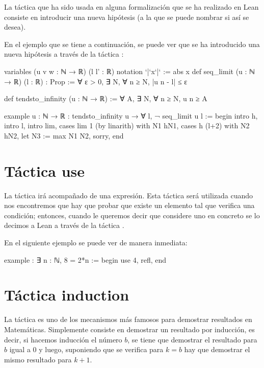 La táctica  que ha sido usada en alguna formalización que
se ha realizado en Lean consiste en introducir una nueva hipótesis (a la que
se puede nombrar si así se desea).

En el ejemplo que se tiene a continuación, se puede ver que se ha introducido
una nueva hipótesis a través de la táctica :

\begin{leancode}
variables (u v w : ℕ → ℝ) (l l' : ℝ)
notation `|`x`|` := abs x
def seq_limit (u : ℕ → ℝ) (l : ℝ) : Prop :=
∀ ε > 0, ∃ N, ∀ n ≥ N, |u n - l| ≤ ε

def tendsto_infinity (u : ℕ → ℝ) := ∀ A, ∃ N, ∀ n ≥ N, u n ≥ A

example {u : ℕ → ℝ} : tendsto_infinity u → ∀ l, ¬ seq_limit u l :=
begin
  intro h,
  intro l,
  intro lim,
  cases lim 1 (by linarith) with N1 hN1,
  cases h (l+2) with N2 hN2,
  let N3 := max N1 N2,
  sorry,
end
\end{leancode}

\section{Táctica use}

La táctica  irá acompañado de una expresión. Esta
táctica será utilizada cuando nos encontremos que hay que probar que
existe un elemento tal que verifica una condición; entonces, cuando le
queremos decir que considere uno en concreto se lo decimos a Lean
a través de la táctica .

En el siguiente ejemplo se puede ver de manera inmediata:

\begin{leancode}
example : ∃ n : ℕ, 8 = 2*n :=
begin
  use 4,
  refl,
end
\end{leancode}

\section{Táctica induction}

La táctica  es uno de los mecanismos más famosos
para demostrar resultados en Matemáticas. Simplemente consiste en demostrar
un resultado por inducción, es decir, si hacemos inducción el número \(b\),
se tiene que demostrar el resultado para \(b\) igual a \(0\) y luego, suponiendo
que se verifica para \(k=b\) hay que demostrar el mismo resultado para \(k+1\).

